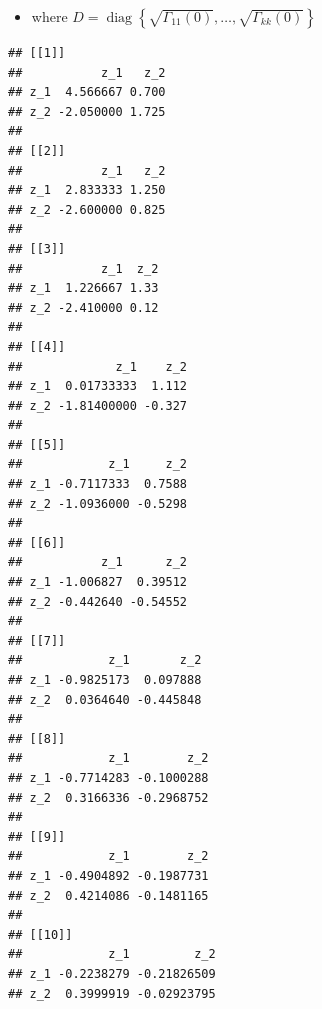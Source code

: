 \documentclass[12pt,a4paper]{article}
\newcommand{\diag}{\operatorname{diag}}
\newenvironment{Shaded}{\begin{snugshade}}{\end{snugshade}}
\newcommand{\CommentTok}[1]{\textcolor[rgb]{0.56,0.35,0.01}{\textit{#1}}}
\newcommand{\ControlFlowTok}[1]{\textcolor[rgb]{0.13,0.29,0.53}{\textbf{#1}}}
\newcommand{\DecValTok}[1]{\textcolor[rgb]{0.00,0.00,0.81}{#1}}
\newcommand{\KeywordTok}[1]{\textcolor[rgb]{0.13,0.29,0.53}{\textbf{#1}}}
\newcommand{\NormalTok}[1]{#1}
\newcommand{\OperatorTok}[1]{\textcolor[rgb]{0.81,0.36,0.00}{\textbf{#1}}}
\newcommand{\StringTok}[1]{\textcolor[rgb]{0.31,0.60,0.02}{#1}}
\begin{document}
\begin{itemize}
  \item where $D  = \diag \left\{ \sqrt{\Gamma_{11} (0)}, \ldots , \sqrt{\Gamma_{kk} (0)} \right\}$ 
\end{itemize}

\begin{Shaded}
\end{Shaded}

\begin{verbatim}
## [[1]]
##           z_1   z_2
## z_1  4.566667 0.700
## z_2 -2.050000 1.725
## 
## [[2]]
##           z_1   z_2
## z_1  2.833333 1.250
## z_2 -2.600000 0.825
## 
## [[3]]
##           z_1  z_2
## z_1  1.226667 1.33
## z_2 -2.410000 0.12
## 
## [[4]]
##             z_1    z_2
## z_1  0.01733333  1.112
## z_2 -1.81400000 -0.327
## 
## [[5]]
##            z_1     z_2
## z_1 -0.7117333  0.7588
## z_2 -1.0936000 -0.5298
## 
## [[6]]
##           z_1      z_2
## z_1 -1.006827  0.39512
## z_2 -0.442640 -0.54552
## 
## [[7]]
##            z_1       z_2
## z_1 -0.9825173  0.097888
## z_2  0.0364640 -0.445848
## 
## [[8]]
##            z_1        z_2
## z_1 -0.7714283 -0.1000288
## z_2  0.3166336 -0.2968752
## 
## [[9]]
##            z_1        z_2
## z_1 -0.4904892 -0.1987731
## z_2  0.4214086 -0.1481165
## 
## [[10]]
##            z_1         z_2
## z_1 -0.2238279 -0.21826509
## z_2  0.3999919 -0.02923795
\end{verbatim}
\end{document}
